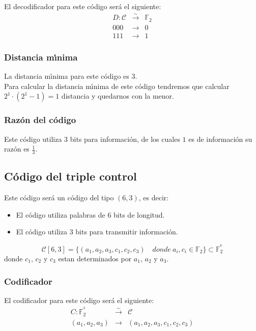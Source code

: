El decodificador para este c\'odigo ser\'a el siguiente:
\begin{eqnarray*}
D:\mathcal{C}&\stackrel{\sim}\longrightarrow & \mathbb{F}_2\\
000&\longrightarrow & 0 \\
111&\longrightarrow & 1
\end{eqnarray*}

\subsubsection{Distancia m\'{\i}nima}

La distancia m\'{\i}nima para este c\'odigo es $3$.\\

Para calcular la distancia m\'{\i}nima de este c\'odigo tendremos que calcular
$2^1\cdot (2^1-1)= 1$ distancia y quedarnos con la menor.

\subsubsection{Raz\'on del c\'odigo}

Este c\'odigo utiliza $3$ bits para informaci\'on, de los cuales
$1$ es de informaci\'on su raz\'on es $\frac{1}{3}$.

\subsection{C\'odigo del triple control}

Este c\'odigo ser\'a un c\'odigo del tipo $(6,3)$, es decir:
\begin{itemize}
\item El c\'odigo utiliza palabras de $6$ bits de longitud.
\item El c\'odigo utiliza $3$ bits para transmitir informaci\'on.
\end{itemize}
\begin{displaymath}
\mathcal{C}[6,3]=\{(a_1,a_2,a_3,c_1,c_2,c_3)\quad donde\ a_i,c_i\in
\mathbb{F}_2\} \subset \mathbb{F}^{^6}_2
\end{displaymath}
donde $c_1$, $c_2$ y $c_3$ estan determinados por $a_1$, $a_2$ y $a_3$.

\subsubsection{Codificador}

El codificador para este c\'odigo ser\'a el siguiente:
\begin{eqnarray*}
C:\mathbb{F}^{^3}_2&\stackrel{\sim}\longrightarrow & \mathcal{C} \\
(a_1,a_2,a_3)&\longrightarrow & (a_1,a_2,a_3,c_1,c_2,c_3)
\end{eqnarray*}

